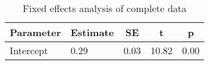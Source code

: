 \begin{table}[ht]
\centering
\caption{Fixed effects analysis of complete data} 
\label{tab:FE}
\begingroup\small
\begin{tabular}{llccc}
  \hline
Parameter & Estimate & SE & t & p \\ 
  \hline
Intercept & 0.29 & 0.03 & 10.82 & 0.00 \\ 
  \end{tabular}
\endgroup
\end{table}
